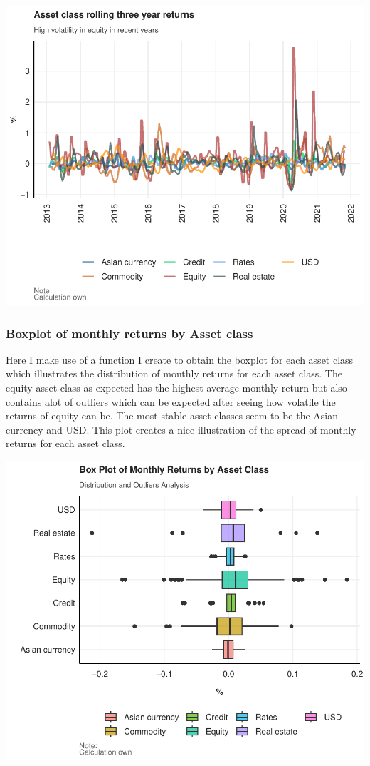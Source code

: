 \documentclass[11pt,preprint, authoryear]{elsarticle}
\numberwithin{equation}{section}
\numberwithin{figure}{section}
\numberwithin{table}{section}
\begin{document}
\includegraphics{Question-6_files/figure-latex/unnamed-chunk-7-1.pdf}

\hypertarget{boxplot-of-monthly-returns-by-asset-class}{%
\subsubsection{Boxplot of monthly returns by Asset
class}\label{boxplot-of-monthly-returns-by-asset-class}}

Here I make use of a function I create to obtain the boxplot for each
asset class which illustrates the distribution of monthly returns for
each asset class. The equity asset class as expected has the highest
average monthly return but also contains alot of outliers which can be
expected after seeing how volatile the returns of equity can be. The
most stable asset classes seem to be the Asian currency and USD. This
plot creates a nice illustration of the spread of monthly returns for
each asset class.

\includegraphics{Question-6_files/figure-latex/unnamed-chunk-8-1.pdf}
\end{document}

